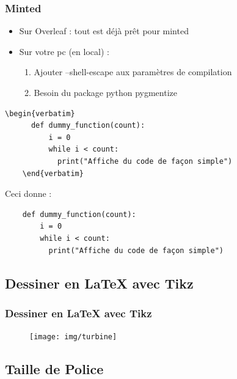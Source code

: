 \begin{frame}[fragile]
  \frametitle{Minted}

  \begin{itemize}
    \item Sur Overleaf : tout est déjà prêt pour minted
    \item Sur votre pc (en local) :
    \begin{enumerate}
      \item Ajouter --shell-escape aux paramètres de compilation
      \item Besoin du package python pygmentize
    \end{enumerate}
  \end{itemize}

  \begin{lstlisting}[mathescape=true]
    \begin{verbatim}
      def dummy_function(count):
          i = 0
          while i < count:
            print("Affiche du code de façon simple")
    \end{verbatim}\end{lstlisting}

  Ceci donne :

  \begin{verbatim}
    def dummy_function(count):
        i = 0
        while i < count:
          print("Affiche du code de façon simple")
  \end{verbatim}
\end{frame}

\subsection{Dessiner en LaTeX avec Tikz}

\begin{frame}[fragile]
  \frametitle{Dessiner en LaTeX avec Tikz}
  \begin{figure}[!ht] \centering
    \texttt{[image: img/turbine]}
  \end{figure}
\end{frame}

\subsection{Taille de Police}

